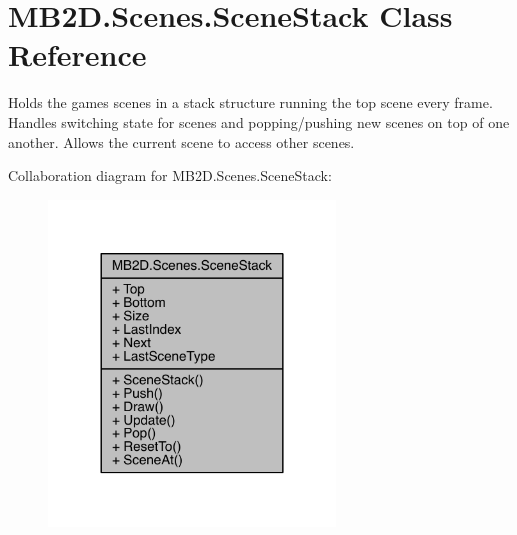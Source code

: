 \hypertarget{class_m_b2_d_1_1_scenes_1_1_scene_stack}{}\section{M\+B2\+D.\+Scenes.\+Scene\+Stack Class Reference}
\label{class_m_b2_d_1_1_scenes_1_1_scene_stack}


Holds the games scenes in a stack structure running the top scene every frame. Handles switching state for scenes and popping/pushing new scenes on top of one another. Allows the current scene to access other scenes.  




Collaboration diagram for M\+B2\+D.\+Scenes.\+Scene\+Stack\+:\nopagebreak
\begin{figure}[H]
\begin{center}
\leavevmode
\includegraphics[width=216pt]{class_m_b2_d_1_1_scenes_1_1_scene_stack__coll__graph}
\end{center}
\end{figure}
